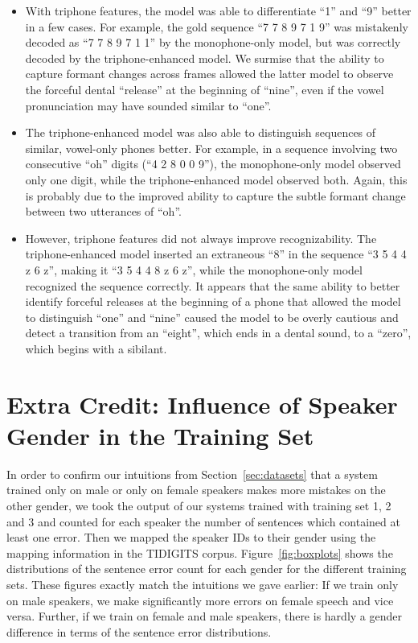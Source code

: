 \documentclass[twocolumn, 11pt]{article}
\begin{document}
\begin{itemize}
  \item With triphone features, the model was able to differentiate ``1'' and
  ``9'' better in a few cases. For example, the gold sequence ``7 7 8 9 7 1 9''
  was mistakenly decoded as ``7 7 8 9 7 1 1'' by the monophone-only model, but
  was correctly decoded by the triphone-enhanced model. We surmise that the
  ability to capture formant changes across frames allowed the latter model to
  observe the forceful dental ``release'' at the beginning of ``nine'', even if
  the vowel pronunciation may have sounded similar to ``one''.
  \item The triphone-enhanced model was also able to distinguish sequences of
  similar, vowel-only phones better. For example, in a sequence involving two
  consecutive ``oh'' digits (``4 2 8 0 0 9''), the monophone-only model observed
  only one digit, while the triphone-enhanced model observed both. Again, this
  is probably due to the improved ability to capture the subtle formant change
  between two utterances of ``oh''.
  \item However, triphone features did not always improve recognizability. The
  triphone-enhanced model inserted an extraneous ``8'' in the sequence ``3 5 4 4
  z 6 z'', making it ``3 5 4 4 8 z 6 z'', while the monophone-only model
  recognized the sequence correctly. It appears that the same ability to better
  identify forceful releases at the beginning of a phone that allowed the model
  to distinguish ``one'' and ``nine'' caused the model to be overly cautious and
  detect a transition from an ``eight'', which ends in a dental sound, to a
  ``zero'', which begins with a sibilant.
\end{itemize}

\section{Extra Credit: Influence of Speaker Gender in the Training Set}

In order to confirm our intuitions from Section~\ref{sec:datasets} that a system
trained only on male or only on female speakers makes more mistakes on the other
gender, we took the output of our systems trained with training set 1, 2 and 3
and counted for each speaker the number of sentences which contained at least
one error. Then we mapped the speaker IDs to their gender using the mapping
information in the TIDIGITS corpus. Figure~\ref{fig:boxplots} shows the
distributions of the sentence error count for each gender for the different
training sets.  These figures exactly match the intuitions we gave earlier: If
we train only on male speakers, we make significantly more errors on female
speech and vice versa.  Further, if we train on female and male speakers, there
is hardly a gender difference in terms of the sentence error distributions. 
\end{document}
